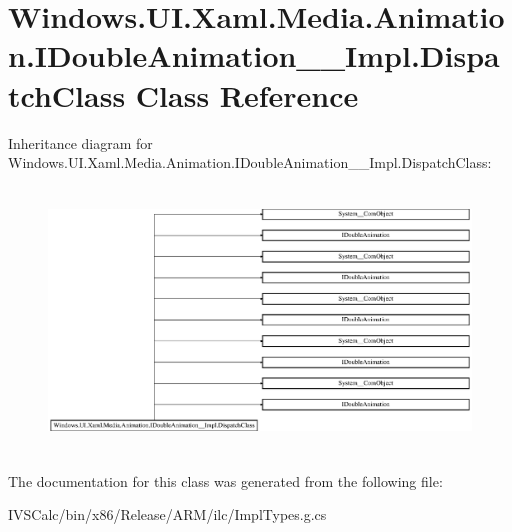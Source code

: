 \hypertarget{class_windows_1_1_u_i_1_1_xaml_1_1_media_1_1_animation_1_1_i_double_animation_____impl_1_1_dispatch_class}{}\section{Windows.\+U\+I.\+Xaml.\+Media.\+Animation.\+I\+Double\+Animation\+\_\+\+\_\+\+Impl.\+Dispatch\+Class Class Reference}
\label{class_windows_1_1_u_i_1_1_xaml_1_1_media_1_1_animation_1_1_i_double_animation_____impl_1_1_dispatch_class}
Inheritance diagram for Windows.\+U\+I.\+Xaml.\+Media.\+Animation.\+I\+Double\+Animation\+\_\+\+\_\+\+Impl.\+Dispatch\+Class\+:\begin{figure}[H]
\begin{center}
\leavevmode
\includegraphics[height=7.048055cm]{class_windows_1_1_u_i_1_1_xaml_1_1_media_1_1_animation_1_1_i_double_animation_____impl_1_1_dispatch_class}
\end{center}
\end{figure}


The documentation for this class was generated from the following file\+:\begin{DoxyCompactItemize}
\item 
I\+V\+S\+Calc/bin/x86/\+Release/\+A\+R\+M/ilc/Impl\+Types.\+g.\+cs\end{DoxyCompactItemize}
